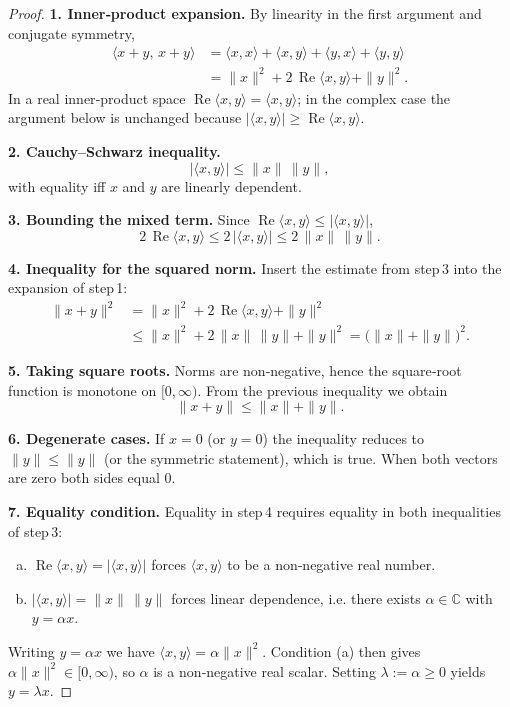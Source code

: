 \begin{proof}
\textbf{1. Inner‑product expansion.}  
By linearity in the first argument and conjugate symmetry,
\begin{align*}
\langle x+y,\,x+y\rangle
&=\langle x,x\rangle+\langle x,y\rangle+\langle y,x\rangle+\langle y,y\rangle  \\
&=\|x\|^{2}+2\,\operatorname{Re}\langle x,y\rangle+\|y\|^{2}.
\end{align*}
In a real inner‑product space \(\operatorname{Re}\langle x,y\rangle=\langle x,y\rangle\); in the complex case the argument below is unchanged because
\(|\langle x,y\rangle|\ge\operatorname{Re}\langle x,y\rangle\).

\medskip
\textbf{2. Cauchy–Schwarz inequality.}  
\[
|\langle x,y\rangle|\le \|x\|\,\|y\|,
\]
with equality iff \(x\) and \(y\) are linearly dependent.

\medskip
\textbf{3. Bounding the mixed term.}  
Since \(\operatorname{Re}\langle x,y\rangle\le |\langle x,y\rangle|\),
\[
2\,\operatorname{Re}\langle x,y\rangle\le 2\,|\langle x,y\rangle|
\le 2\,\|x\|\,\|y\|.
\]

\medskip
\textbf{4. Inequality for the squared norm.}  
Insert the estimate from step 3 into the expansion of step 1:
\begin{align*}
\|x+y\|^{2}
&=\|x\|^{2}+2\,\operatorname{Re}\langle x,y\rangle+\|y\|^{2} \\
&\le \|x\|^{2}+2\,\|x\|\,\|y\|+\|y\|^{2}
   =\bigl(\|x\|+\|y\|\bigr)^{2}.
\end{align*}

\medskip
\textbf{5. Taking square roots.}  
Norms are non‑negative, hence the square‑root function is monotone on
\([0,\infty)\). From the previous inequality we obtain
\[
\|x+y\|\le \|x\|+\|y\|.
\]

\medskip
\textbf{6. Degenerate cases.}  
If \(x=0\) (or \(y=0\)) the inequality reduces to \(\|y\|\le\|y\|\) (or the symmetric
statement), which is true. When both vectors are zero both sides equal \(0\).

\medskip
\textbf{7. Equality condition.}  
Equality in step 4 requires equality in both inequalities of step 3:

\begin{enumerate}[(a)]
\item \(\operatorname{Re}\langle x,y\rangle = |\langle x,y\rangle|\) forces
      \(\langle x,y\rangle\) to be a non‑negative real number.
\item \(|\langle x,y\rangle| = \|x\|\,\|y\|\) forces linear dependence, i.e.
      there exists \(\alpha\in\mathbb{C}\) with \(y=\alpha x\).
\end{enumerate}
Writing \(y=\alpha x\) we have \(\langle x,y\rangle=\alpha\|x\|^{2}\).
Condition (a) then gives \(\alpha\|x\|^{2}\in[0,\infty)\), so \(\alpha\) is a
non‑negative real scalar. Setting \(\lambda:=\alpha\ge 0\) yields \(y=\lambda x\).


\end{proof}
